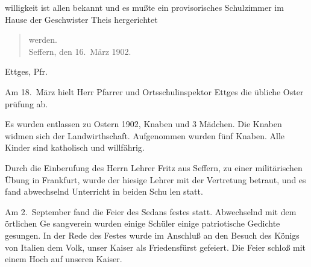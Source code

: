 

%
        willigkeit ist allen bekannt und es\ob
        mußte ein provisorisches Schulzimmer\ob
        im Hause der Geschwister Theis hergerichtet

\pend
\begin{verse}
werden.\\
Seffern, den 16.\ März 1902.
\end{verse}
\pstart
Ettges, Pfr.

\pend
{}
\pstart

Am 18.\ März hielt Herr Pfarrer und\ob
Ortsschulinspektor Ettges die übliche Oster\ohb
prüfung ab.

\pend
{}
\pstart

Es wurden entlassen zu Ostern 1902, Knaben und 3 Mädchen. Die Knaben\ob
widmen sich der Landwirthschaft. Aufgenommen\ob
wurden fünf Knaben. Alle Kinder sind\ob
katholisch und willfährig\unsicher.

\pend
{}
\pstart

Durch die Einberufung des Herrn Lehrer Fritz\ob
aus Seffern, zu einer militärischen\ob
Übung in Frankfurt, wurde der hiesige\ob
Lehrer mit der Vertretung betraut, und es\ob
fand abwechselnd Unterricht in beiden Schu\ohb
len statt.

\pend
{}
\pstart

Am 2.\ September fand die Feier des Sedans\ohb
festes statt. Abwechselnd mit dem örtlichen Ge\ohb
sangverein wurden einige Schüler\unsicher{} einige\ob
patriotische Gedichte gesungen\unsicher. In der Rede\ob
des Festes wurde im Anschluß an den Besuch\ob
des Königs von Italien dem Volk, unser Kaiser\ob
als Friedensfürst gefeiert. Die Feier schloß mit\ob
einem Hoch auf unseren Kaiser.
\pend
